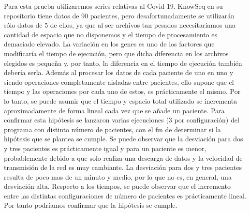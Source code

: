 Para esta prueba utilizaremos series relativas al Covid-19. KnowSeq en su repositorio tiene datos de 90 pacientes, pero desafortunadamente se utilizarán sólo datos de 5 de ellos, ya que al ser archivos tan pesados necesitaríamos una cantidad de espacio que no disponemos y el tiempo de procesamiento es demasiado elevado. La variación en los genes es uno de los factores que modificaría el tiempo de ejecución, pero que dicha diferencia en los archivos elegidos es pequeña y, por tanto, la diferencia en el tiempo de ejecución también debería serla. Además al procesar los datos de cada paciente de uno en uno y siendo operaciones completamente aisladas entre pacientes, ello supone que el tiempo y las operaciones por cada uno de estos, es prácticamente el mismo. Por lo tanto, se puede asumir que el tiempo y espacio total utilizado se incrementa aproximadamente de forma lineal cada vez que se añade un paciente. Para confirmar esta hipótesis se lanzaron varias ejecuciones (3 por configuración) del programa con distinto número de pacientes, con el fin de determinar si la hipótesis que se plantea se cumple. Se puede observar que la desviación para dos y tres pacientes es prácticamente igual y para un paciente es menor, probablemente debido a que solo realiza una descarga de datos y la velocidad de transmisión de la red es muy cambiante. La desviación para dos y tres pacientes resulta de poco mas de un minuto y medio, por lo que no es, en general, una desviación alta. Respecto a los tiempos, se puede observar que el incremento entre las distintas configuraciones de número de pacientes es prácticamente lineal. Por tanto podríamos confirmar que la hipótesis se cumple. \\
\begin{table}[h]
    \centering
    \caption{Tiempos de ejecución para KnowSeq con distinto número de pacientes}
    \label{tab:my_label}
\end{table}
\begin{table}[h]
    \centering
\end{table}

